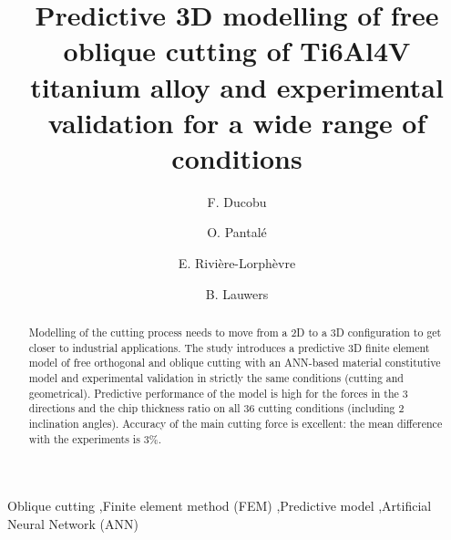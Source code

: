 \documentclass[final,5p,times,twocolumn]{elsarticle}
\begin{document}
\begin{frontmatter}

\title{Predictive 3D modelling of free oblique cutting of Ti6Al4V titanium alloy and experimental validation for a wide range of conditions}

\author[1]{F. Ducobu}

\author[2]{O. Pantal\'{e}}
\author[1]{E. Rivi\`{e}re-Lorph\`{e}vre}
\author[3]{B. Lauwers}

\address[1]{Machine Design and Production Engineering Lab, Research Institute for Science and Material Engineering, UMONS, Belgium}
\address[2]{Laboratoire G\'{e}nie de Production, INP/ENIT, Universit\'{e} de Toulouse, Tarbes, France}
\address[3]{Department of Mechanical Engineering, KU Leuven \& Flanders Make@KU Leuven-MaPS, Belgium}

\begin{abstract}

Modelling of the cutting process needs to move from a 2D to a 3D configuration to get closer to industrial applications. The study introduces a predictive 3D finite element model of free orthogonal and oblique cutting with an ANN-based material constitutive model and experimental validation in strictly the same conditions (cutting and geometrical). Predictive performance of the model is high for the forces in the 3 directions and the chip thickness ratio on all 36 cutting conditions (including 2 inclination angles). Accuracy of the main cutting force is excellent: the mean difference with the experiments is 3\%.

\end{abstract}

\begin{keyword}

Oblique cutting \sep Finite element method (FEM) \sep Predictive model \sep Artificial Neural Network (ANN)

\end{keyword}

\end{frontmatter}

\linenumbers

\end{document}
